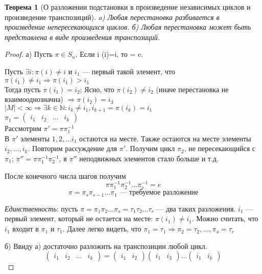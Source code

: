 \documentclass[a4paper]{article}
\theoremstyle{definition}
\theoremstyle{plain}
\newtheorem{theorem}{Теорема}
\begin{document}
\begin{theorem}[О разложении подстановки в произведение независимых циклов и произведение транспозиций]
  a) Любая перестановка разбивается в произведение непересекающихся циклов.
  б) Любая перестановка может быть представлена в виде произведения транспозиций.
\end{theorem}
\begin{proof}
  а) Пусть $\pi \in S_{n}$. Если \forall i \pi(i)=i, то \pi{} = e.

  Пусть $\exists i: \pi(i) \neq i$ и $i_{1}$ --- первый такой элемент, что $\pi(i_{1}) \neq i_{1} \Rightarrow \pi(i_{1}) > i_{1}$\\
  Тогда пусть $\pi(i_{1}) = i_{2}$; Ясно, что $\pi(i_{2}) \neq i_{2}$ (иначе перестановка не взаимооднозначна) $\Rightarrow \pi(i_{2}) = i_{3}$\\
  $|M| < \infty \Rightarrow \exists k \in \mathbb{N}: i_{k} \neq i_{1}, i_{k + 1} = \pi(i_{k}) = i_{1}$\\
  $\pi_{1} = \begin{pmatrix}i_{1}&i_{2}&\ldots&i_{k}\end{pmatrix}$\\
  Рассмотрим $\pi' = \pi \pi_{1}^{-1}$\\
  В $\pi'$ элементы $1, 2, \ldots{} i_{1}$ остаются на месте.
  Также остаются на месте элементы $i_{2}, \ldots, i_{k}$.
  Повторим рассуждение для $\pi'$.
  Получим цикл $\pi_{2}$, не пересекающийся с $\pi_{1}$; $\pi'' = \pi \pi_{1}^{-1} \pi_{2}^{-1}$, в $\pi''$ неподвижных элементов стало больше и т.д.

  После конечного числа шагов получим
  \begin{equation*}
    \pi \pi_{1}^{-1} \pi_{2}^{-1} \ldots \pi_{s}^{-1} = e
  \end{equation*}
  \begin{equation*}
    \pi = \pi_{s}\pi_{s-1} \ldots \pi_{1} \text{ --- требуемое разложение}
  \end{equation*}

  \emph{Единственность}:
  пусть $\pi = \pi_{1} \pi_{2} \ldots \pi_{s} = \tau_{1} \tau_{2} \ldots \tau_{r}$ --- два таких разложения.
  $i_{1}$ --- первый элемент, который не остается на месте: $\pi(i_{1}) \neq i_{1}$.
  Можно считать, что $i_{1}$ входит в $\pi_{1}$ и $\tau_{1}$.
  Далее легко видеть, что $\pi_{1} = \tau_{1} \Rightarrow \pi_{2} = \tau_{2}, \ldots, \pi_{s} = \tau_{r}$

  б) Ввиду а) достаточно разложить на транспозиции любой цикл.
  \begin{equation*}
    \begin{pmatrix}
      i_{1}&i_{2}&\ldots&i_{k}
    \end{pmatrix}
    =
    \begin{pmatrix}
      i_{1}&i_{2}
    \end{pmatrix}
    \begin{pmatrix}
      i_{1}&i_{3}
    \end{pmatrix}
    \ldots
    \begin{pmatrix}
      i_{1}&i_{k}
    \end{pmatrix}
  \end{equation*}
\end{proof}
\end{document}
